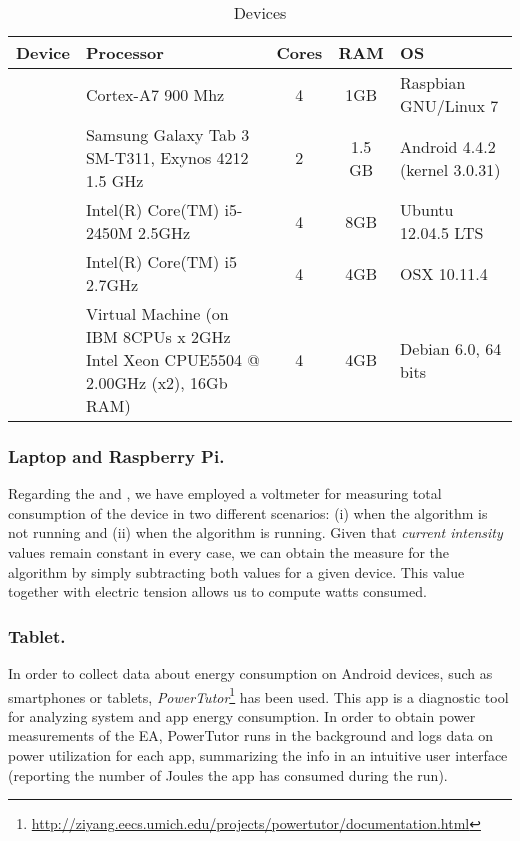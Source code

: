 \begin{table}[!t]
\centering
\caption{Devices}
\label{Table:devices}
\begin{tabular}{lp{4.5cm}ccp{3cm}} \hline
Device		&	Processor			&	Cores	&	RAM &	OS		\\ 
\hline
\raspberry   	& Cortex-A7 900 Mhz			&	 4 	&	1GB &	Raspbian GNU/Linux 7	\\
\tablet		& Samsung Galaxy Tab 3 SM-T311, Exynos 4212 1.5 GHz& 2  & 1.5 GB &	Android	4.4.2 (kernel 3.0.31) \\
\laptop 		& Intel(R) Core(TM) i5-2450M 2.5GHz	&	4	&	8GB &	Ubuntu 12.04.5 LTS \\
\iMac		& Intel(R) Core(TM) i5 2.7GHz	& 4	& 4GB 	&OSX 10.11.4			\\
\blade		& Virtual Machine (on IBM 8CPUs x 2GHz Intel Xeon CPUE5504 @ 2.00GHz (x2), 16Gb RAM) & 4 & 4GB & Debian 6.0, 64 bits\\
\hline
\end{tabular}
\end{table}


\subsubsection*{Laptop and Raspberry Pi.}
Regarding the \laptop and \raspberrynsp, we have employed a voltmeter for measuring total consumption of the device in two different scenarios:  (i) when the algorithm is not running and (ii) when the algorithm is running.  Given that \emph{current intensity} values remain constant in every case, we can obtain the measure for the algorithm by simply subtracting both values for a given device.  This value together with electric tension allows us to compute watts consumed.

\subsubsection*{Tablet.}
In order to collect data about energy consumption on Android devices, such as smartphones or tablets, \emph{PowerTutor}\footnote{\url{http://ziyang.eecs.umich.edu/projects/powertutor/documentation.html}} \cite{powertutor2} has been used. 
This app is a diagnostic tool for analyzing system and app energy consumption.
In order to obtain power measurements of the EA, PowerTutor runs in the background and logs data on power utilization for each app, summarizing the info in an intuitive user interface (reporting the number of Joules the app has consumed during the run).


